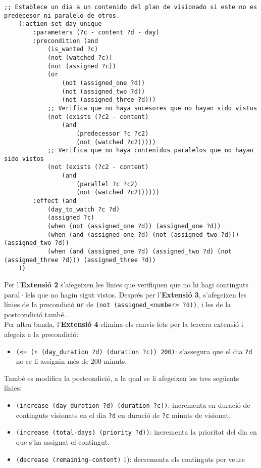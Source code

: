 \documentclass[a4paper]{article}
\begin{document}
	\begin{lstlisting}[language=PDDL, caption={Acció set\_day\_unique}, label={lst:set_day_unique}]
	;; Establece un dia a un contenido del plan de visionado si este no es predecesor ni paralelo de otros.
 	(:action set_day_unique
		:parameters (?c - content ?d - day)
		:precondition (and 
			(is_wanted ?c)
			(not (watched ?c))
			(not (assigned ?c))
			(or 
				(not (assigned_one ?d))
				(not (assigned_two ?d))
				(not (assigned_three ?d)))
			;; Verifica que no haya sucesores que no hayan sido vistos
			(not (exists (?c2 - content) 
				(and 
					(predecessor ?c ?c2)
					(not (watched ?c2)))))
			;; Verifica que no haya contenidos paralelos que no hayan sido vistos
			(not (exists (?c2 - content) 
				(and 
					(parallel ?c ?c2)
					(not (watched ?c2))))))
		:effect (and 
			(day_to_watch ?c ?d)
			(assigned ?c)
			(when (not (assigned_one ?d)) (assigned_one ?d))
			(when (and (assigned_one ?d) (not (assigned_two ?d))) (assigned_two ?d))
			(when (and (assigned_one ?d) (assigned_two ?d) (not (assigned_three ?d))) (assigned_three ?d))
	))
	\end{lstlisting}
	
	\noindent Per l'\textbf{Extensió 2} s'afegeixen les línies que verifiquen que no hi hagi continguts paral·lels que no hagin sigut vistos. Després per l'\textbf{Extensió 3}, s'afegeixen les línies de la precondició \texttt{or} de \texttt{(not (assigned\_<number> ?d))}, i les de la postcondició també.. \\
	
	\noindent Per altra banda, l'\textbf{Extensió 4} elimina els canvis fets per la tercera extensió i afegeix a la precondició:
	
	\begin{itemize}[label={}, leftmargin=1.5em, itemsep=0pt]
		\item \texttt{(<= (+ (day\_duration ?d) (duration ?c)) 200)}: s'assegura que el dia \texttt{?d} no se li assignin més de 200 minuts. \\
	\end{itemize}
	
	\noindent També es modifica la postcondició, a la qual se li afegeixen les tres següents línies:
	
	\begin{itemize}[label={}, leftmargin=1.5em, itemsep=0pt]
		\item \texttt{(increase (day\_duration ?d) (duration ?c))}: incrementa en duració de continguts visionats en el dia \texttt{?d} en duració de \texttt{?c} minuts de visionat.
		
		\item \texttt{(increase (total-days) (priority ?d))}: incrementa la prioritat del dia en que s'ha assignat el contingut.
		
		\item \texttt{(decrease (remaining-content)} 1): decrementa els continguts per veure
	\end{itemize}
	
\end{document}
